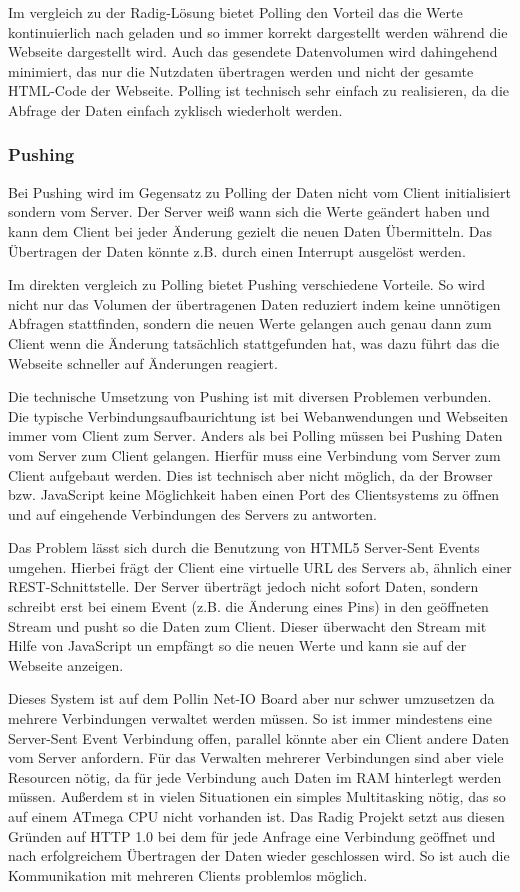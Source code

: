 Im vergleich zu der Radig-Lösung bietet Polling den Vorteil das die Werte kontinuierlich 
nach geladen und so immer korrekt dargestellt werden während die Webseite dargestellt 
wird. Auch das gesendete Datenvolumen wird dahingehend minimiert, das nur die Nutzdaten 
übertragen werden und nicht der gesamte HTML-Code der Webseite. Polling ist technisch sehr 
einfach zu realisieren, da die Abfrage der Daten einfach zyklisch wiederholt werden.

\subsubsection{Pushing}
Bei Pushing wird im Gegensatz zu Polling der Daten nicht vom Client initialisiert sondern 
vom Server. Der Server weiß wann sich die Werte geändert haben und kann dem Client bei 
jeder Änderung gezielt die neuen Daten Übermitteln. Das Übertragen der Daten könnte z.B. 
durch einen Interrupt ausgelöst werden.

Im direkten vergleich zu Polling bietet Pushing verschiedene Vorteile. So wird nicht nur 
das Volumen der übertragenen Daten reduziert indem keine unnötigen Abfragen stattfinden,
sondern die neuen Werte gelangen auch genau dann zum Client wenn die Änderung tatsächlich 
stattgefunden hat, was dazu führt das die Webseite schneller auf Änderungen reagiert.

Die technische Umsetzung von Pushing ist mit diversen Problemen verbunden. Die typische 
Verbindungsaufbaurichtung ist bei Webanwendungen und Webseiten immer vom Client zum 
Server. Anders als bei Polling müssen bei Pushing Daten vom Server zum Client gelangen. 
Hierfür muss eine Verbindung vom Server zum Client aufgebaut werden. Dies ist technisch 
aber nicht möglich, da der Browser bzw. JavaScript keine Möglichkeit haben einen Port des 
Clientsystems zu öffnen und auf eingehende Verbindungen des Servers zu antworten. 

Das Problem lässt sich durch die Benutzung von HTML5 Server-Sent Events umgehen. Hierbei 
frägt der Client eine virtuelle URL des Servers ab, ähnlich einer REST-Schnittstelle. Der 
Server überträgt jedoch nicht sofort Daten, sondern schreibt erst bei einem Event (z.B. 
die Änderung eines Pins) in den geöffneten Stream und pusht so die Daten zum Client. 
Dieser überwacht den Stream mit Hilfe von JavaScript un empfängt so die neuen Werte und 
kann sie auf der Webseite anzeigen.

Dieses System ist auf dem Pollin Net-IO Board aber nur schwer umzusetzen da mehrere 
Verbindungen verwaltet werden müssen. So ist immer mindestens eine Server-Sent Event 
Verbindung offen, parallel könnte aber ein Client andere Daten vom Server anfordern. Für 
das Verwalten mehrerer Verbindungen sind aber viele Resourcen nötig, da für jede 
Verbindung auch Daten im RAM hinterlegt werden müssen. Außerdem st in vielen Situationen 
ein simples Multitasking nötig, das so auf einem ATmega CPU nicht vorhanden ist. Das Radig 
Projekt setzt aus diesen Gründen auf HTTP 1.0 bei dem für jede Anfrage eine Verbindung 
geöffnet und nach erfolgreichem Übertragen der Daten wieder geschlossen wird. So ist auch 
die Kommunikation mit mehreren Clients problemlos möglich.

